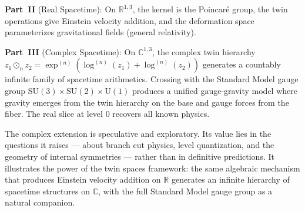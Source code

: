 \documentclass[12pt]{article}
\theoremstyle{plain}
\theoremstyle{definition}
\theoremstyle{remark}
\newcommand{\SU}{\mathrm{SU}}
\newcommand{\UU}{\mathrm{U}}
\newcommand{\CC}{\mathbb{C}}
\newcommand{\RR}{\mathbb{R}}
\begin{document}
\textbf{Part~II} (Real Spacetime): On $\RR^{1,3}$, the kernel is the Poincar\'e group, the twin operations give Einstein velocity addition, and the deformation space parameterizes gravitational fields (general relativity).

\textbf{Part~III} (Complex Spacetime): On $\CC^{1,3}$, the complex twin hierarchy $z_1 \odot_n z_2 = \exp^{(n)}(\log^{(n)}(z_1) + \log^{(n)}(z_2))$ generates a countably infinite family of spacetime arithmetics. Crossing with the Standard Model gauge group $\SU(3) \times \SU(2) \times \UU(1)$ produces a unified gauge-gravity model where gravity emerges from the twin hierarchy on the base and gauge forces from the fiber. The real slice at level $0$ recovers all known physics.

The complex extension is speculative and exploratory. Its value lies in the questions it raises --- about branch cut physics, level quantization, and the geometry of internal symmetries --- rather than in definitive predictions. It illustrates the power of the twin spaces framework: the same algebraic mechanism that produces Einstein velocity addition on $\RR$ generates an infinite hierarchy of spacetime structures on $\CC$, with the full Standard Model gauge group as a natural companion.
\end{document}
